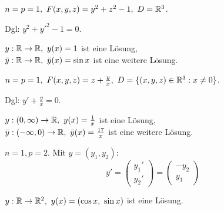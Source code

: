 \documentclass[a4paper,twoside,DIV15,BCOR12mm]{scrbook}
\begin{document}
\begin{beispiele}
\item $n=p=1,\ F(x,y,z) = y^2+z^2-1,\ D=\MdR^3$.

Dgl: $y^2+y'^2-1=0.$

$y:\mathbb{R}\to\mathbb{R},\ y(x)=1$ ist eine Lösung,\\
$\bar{y}:\mathbb{R}\to\mathbb{R},\ \bar{y}(x)=\sin x$ ist eine weitere Lösung.

\item $n=p=1,\ F(x,y,z)=z+\frac{y}{x},\ D=\{(x,y,z)\in\MdR^3:x\ne0\}$.

Dgl: $y'+\frac{y}{x}=0.$

$y:(0,\infty)\to\MdR,\ y(x)=\frac{1}{x}$ ist eine Lösung,\\
$\bar{y}:(-\infty,0)\to\MdR,\ \bar{y}(x)=\frac{17}{x}$ ist eine weitere Lösung.

\item $n=1,p=2.$ Mit $y=(y_1,y_2):$
$$y'=\begin{pmatrix}y_1'\\ y_2'\end{pmatrix} = \begin{pmatrix}-y_2\\ y_1\end{pmatrix}$$

$y:\mathbb{R}\to\mathbb{R}^2,\ y(x)=(\cos x,\ \sin x)$ ist eine Lösung.
\end{beispiele}
\end{document}

